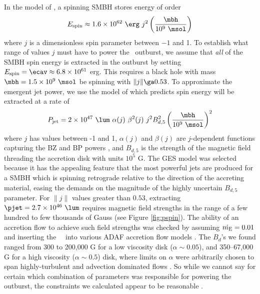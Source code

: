 \documentclass[11pt, preprint]{aastex}
\begin{document}
In the model of \citet{1999ApJ...522..753M}, a spinning SMBH stores
energy of order
\begin{equation}
  E_{\rm{spin}} \approx 1.6 \times 10^{62} ~{\erg} ~j^2
  \left(\frac{\mbh}{10^9 ~\msol}\right)
\end{equation}
where $j$ is a dimensionless spin parameter between $-1$ and 1. To
establish what range of values $j$ must have to power the
\rbs\ outburst, we assume that {\it{all}} of the SMBH spin energy is
extracted in the outburst by setting $E_{\rm{spin}} = \ecav \approx
6.8 \times 10^{61}$ erg. This requires a black hole with mass $\mbh =
1.5 \times 10^{9} ~\msol$ be spinning with $\|j\| \ga 0.53$. To
approximate the emergent jet power, we use the model of \citet[][GES
  hereafter]{gesspin} which predicts spin energy will be extracted at
a rate of
\begin{equation}
  P_{\rm{jet}} = 2 \times 10^{47} ~{\lum} ~\alpha(j) ~\beta^2(j) ~j^2
  B_{d,5}^2 \left(\frac{\mbh}{10^9 ~\msol}\right)^2
  \label{eqn:ges}
\end{equation}
where $j$ has values between -1 and 1, $\alpha(j)$ and $\beta(j)$ are
$j$-dependent functions capturing the BZ and BP powers
\citep[see][]{2009ApJ...699L..52G}, and $B_{d,5}$ is the strength of
the magnetic field threading the accretion disk with units $10^5$
G. The GES model was selected because it has the appealing feature
that the most powerful jets are produced for a SMBH which is spinning
retrograde relative to the direction of the accreting material, easing
the demands on the magnitude of the highly uncertain $B_{d,5}$
parameter. For $\|j\|$ values greater than $0.53$, extracting $\pjet =
2.7 \times 10^{46} ~\lum$ requires magnetic field strengths in the
range of a few hundred to few thousands of Gauss (see Figure
\ref{fig:pspin}). The ability of an accretion flow to achieve such
field strengths was checked by assuming $\dot{m_{\rm{E}}}=0.01$ and inserting the
\rbs\ \mbh\ into various ADAF accretion flow models
\citep[\eg][]{2006ApJ...651.1023R, 2007MNRAS.377.1652N,
  2009MNRAS.397.1302B, gesspin}. The $B_d$'s we found ranged from 300
to 200,000 G for a low viscosity disk ($\alpha \sim 0.05$), and
350--67,000 G for a high viscosity ($\alpha \sim 0.5$) disk, where
limits on $\alpha$ were arbitrarily chosen to span highly-turbulent
and advection dominated flows \citep[\eg][]{2001ApJ...548..348H}. So
while we cannot say for certain which combination of parameters was
responsible for powering the outburst, the constraints we calculated
appear to be reasonable \citep[\eg][]{2002Sci...295.1688K}.
\end{document}
